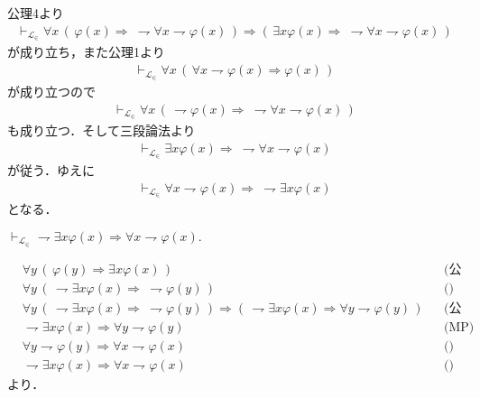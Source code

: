 	公理4より
	\begin{align}
		\vdash_{\mathcal{L}_{\in}} \forall x\, (\, \varphi(x) \Longrightarrow\ 
		\rightharpoondown \forall x \rightharpoondown \varphi(x)\, )
		\Longrightarrow (\, \exists x \varphi(x)
		\Longrightarrow\ \rightharpoondown \forall x \rightharpoondown \varphi(x)\, )
	\end{align}
	が成り立ち，また公理1より
	\begin{align}
		\vdash_{\mathcal{L}_{\in}}
		\forall x\, (\, \forall x \rightharpoondown \varphi(x)
		\Longrightarrow \varphi(x)\, )
	\end{align}
	が成り立つので
	\begin{align}
		\vdash_{\mathcal{L}_{\in}}
		\forall x\, (\, \rightharpoondown \varphi(x)
		\Longrightarrow\ \rightharpoondown \forall x \rightharpoondown \varphi(x)\, )
	\end{align}
	も成り立つ．そして三段論法より
	\begin{align}
		\vdash_{\mathcal{L}_{\in}} \exists x \varphi(x)
		\Longrightarrow\ \rightharpoondown \forall x \rightharpoondown \varphi(x)
	\end{align}
	が従う．ゆえに
	\begin{align}
		\vdash_{\mathcal{L}_{\in}} \forall x \rightharpoondown \varphi(x) 
		\Longrightarrow\ \rightharpoondown \exists x \varphi(x)
	\end{align}
	となる．
	
	\begin{screen}
		\begin{logicalthm}[De Morgan 2]
			$\vdash_{\mathcal{L}_{\in}} \rightharpoondown \exists x \varphi(x)
			\Longrightarrow \forall x \rightharpoondown \varphi(x).$
		\end{logicalthm}
	\end{screen}
	
	\begin{align}
		&\forall y\, (\, \varphi(y) \Longrightarrow \exists x \varphi(x)\, )
		&& \mbox{(公理2)} \\
		&\forall y\, (\, \rightharpoondown \exists x \varphi(x) 
		\Longrightarrow\ \rightharpoondown \varphi(y)\, )
		&& \mbox{()} \\
		&\forall y\, (\, \rightharpoondown \exists x \varphi(x) 
		\Longrightarrow\ \rightharpoondown \varphi(y)\, )
		\Longrightarrow (\, \rightharpoondown \exists x \varphi(x) 
		\Longrightarrow \forall y \rightharpoondown \varphi(y)\, )
		&& \mbox{(公理3)} \\
		&\rightharpoondown \exists x \varphi(x)
		\Longrightarrow \forall y \rightharpoondown \varphi(y)
		&& \mbox{(MP)} \\
		&\forall y \rightharpoondown \varphi(y)
		\Longrightarrow \forall x \rightharpoondown \varphi(x)
		&& \mbox{()} \\
		&\rightharpoondown \exists x \varphi(x)
		\Longrightarrow \forall x \rightharpoondown \varphi(x)
		&& \mbox{()}
	\end{align}
	より．
	
